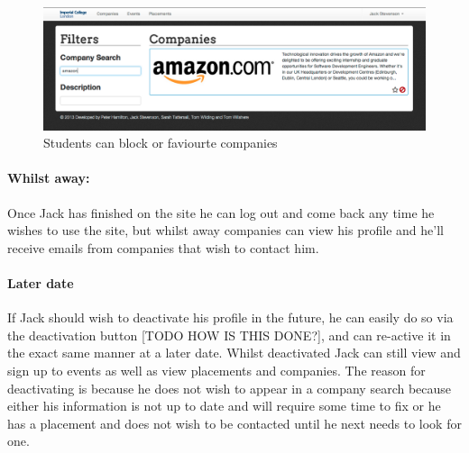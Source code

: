     \begin{figure}[H]\centering
    \includegraphics[scale=0.3]{images/user_experiences/student/block_amazon}
    \caption{Students can block or faviourte companies}
    \end{figure}

  \paragraph{Whilst away:}
    Once Jack has finished on the site he can log out and come back any time he wishes to use the site, but whilst away companies can view his profile and he'll receive emails from companies that wish to contact him.

  \paragraph{Later date}
    If Jack should wish to deactivate his profile in the future, he can easily do so via the deactivation button [TODO HOW IS THIS DONE?], and can re-active it in the exact same manner at a later date. Whilst deactivated Jack can still view and sign up to events as well as view placements and companies. The reason for deactivating is because he does not wish to appear in a company search because either his information is not up to date and will require some time to fix or he has a placement and does not wish to be contacted until he next needs to look for one.

